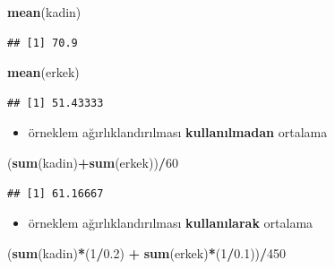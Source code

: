 \documentclass[
  oneside]{book}
\newenvironment{Shaded}{\begin{snugshade}}{\end{snugshade}}
\newcommand{\DecValTok}[1]{\textcolor[rgb]{0.00,0.00,0.81}{#1}}
\newcommand{\FloatTok}[1]{\textcolor[rgb]{0.00,0.00,0.81}{#1}}
\newcommand{\FunctionTok}[1]{\textcolor[rgb]{0.13,0.29,0.53}{\textbf{#1}}}
\newcommand{\NormalTok}[1]{#1}
\newcommand{\SpecialCharTok}[1]{\textcolor[rgb]{0.81,0.36,0.00}{\textbf{#1}}}
\providecommand{\tightlist}{%
  \setlength{\itemsep}{0pt}\setlength{\parskip}{0pt}}
\begin{document}
\begin{Shaded}
\begin{Highlighting}[]
\FunctionTok{mean}\NormalTok{(kadin)}
\end{Highlighting}
\end{Shaded}

\begin{verbatim}
## [1] 70.9
\end{verbatim}

\begin{Shaded}
\begin{Highlighting}[]
\FunctionTok{mean}\NormalTok{(erkek)}
\end{Highlighting}
\end{Shaded}

\begin{verbatim}
## [1] 51.43333
\end{verbatim}

\begin{itemize}
\tightlist
\item
  örneklem ağırlıklandırılması \textbf{kullanılmadan} ortalama
\end{itemize}

\begin{Shaded}
\begin{Highlighting}[]
\NormalTok{(}\FunctionTok{sum}\NormalTok{(kadin)}\SpecialCharTok{+}\FunctionTok{sum}\NormalTok{(erkek))}\SpecialCharTok{/}\DecValTok{60}
\end{Highlighting}
\end{Shaded}

\begin{verbatim}
## [1] 61.16667
\end{verbatim}

\begin{itemize}
\tightlist
\item
  örneklem ağırlıklandırılması \textbf{kullanılarak} ortalama
\end{itemize}

\begin{Shaded}
\begin{Highlighting}[]
\NormalTok{(}\FunctionTok{sum}\NormalTok{(kadin)}\SpecialCharTok{*}\NormalTok{(}\DecValTok{1}\SpecialCharTok{/}\FloatTok{0.2}\NormalTok{) }\SpecialCharTok{+} \FunctionTok{sum}\NormalTok{(erkek)}\SpecialCharTok{*}\NormalTok{(}\DecValTok{1}\SpecialCharTok{/}\FloatTok{0.1}\NormalTok{))}\SpecialCharTok{/}\DecValTok{450}
\end{Highlighting}
\end{Shaded}
\end{document}
